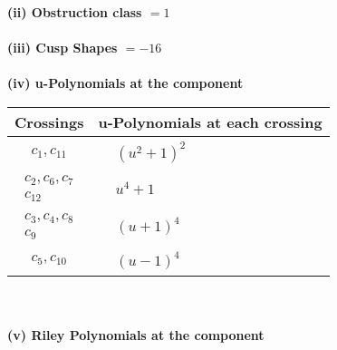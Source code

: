 \documentclass[1p]{elsarticle_modified}
\theoremstyle{definition}
\begin{document}
\flushleft \textbf{(ii) Obstruction class $= 1$}\\~\\
\flushleft \textbf{(iii) Cusp Shapes $= -16$}\\~\\
\newpage\renewcommand{\arraystretch}{1}
\flushleft \textbf{(iv) u-Polynomials at the component}\newline \\
\begin{tabular}{m{50pt}|m{274pt}}
Crossings & \hspace{64pt}u-Polynomials at each crossing \\
\hline $$\begin{aligned}c_{1},c_{11}\end{aligned}$$&$\begin{aligned}
&(u^2+1)^2
\end{aligned}$\\
\hline $$\begin{aligned}c_{2},c_{6},c_{7}\\c_{12}\end{aligned}$$&$\begin{aligned}
&u^4+1
\end{aligned}$\\
\hline $$\begin{aligned}c_{3},c_{4},c_{8}\\c_{9}\end{aligned}$$&$\begin{aligned}
&(u+1)^4
\end{aligned}$\\
\hline $$\begin{aligned}c_{5},c_{10}\end{aligned}$$&$\begin{aligned}
&(u-1)^4
\end{aligned}$\\
\hline
\end{tabular}\\~\\
\newpage\renewcommand{\arraystretch}{1}
\flushleft \textbf{(v) Riley Polynomials at the component}\newline \\
\end{document}
